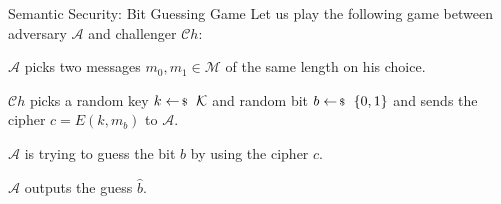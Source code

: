 \documentclass{zkdl-presentation-template}
\begin{document}
    \begin{frame}{Semantic Security: Bit Guessing Game}
        Let us play the following game between adversary $\mathcal{A}$ and challenger $\mathcal{C}h$:
        \begin{algoen}
            \item $\mathcal{A}$ picks two messages $m_0,m_1 \in \mathcal{M}$ of the same length on his choice.\pause
            \item $\mathcal{C}h$ picks a random key $k \leftarrowS \mathcal{K}$ and random bit $b \leftarrowS \{0,1\}$ and sends the cipher $c = E(k,m_b)$ to $\mathcal{A}$.\pause
            \item $\mathcal{A}$ is trying to guess the bit $b$ by using the cipher $c$.\pause
            \item $\mathcal{A}$ outputs the guess $\widehat{b}$.
        \end{algoen}
    \end{frame}
\end{document}
